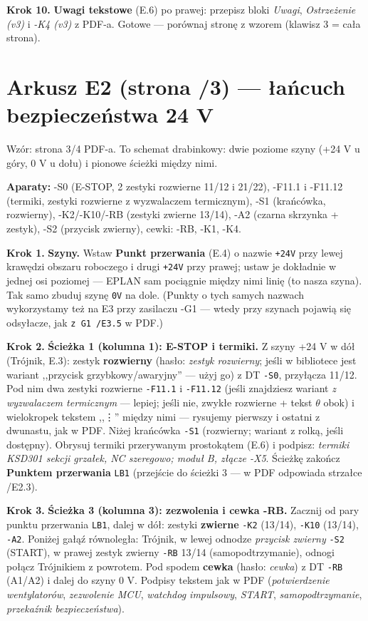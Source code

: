 \documentclass[11pt,a4paper]{article}
\newcommand{\ui}[1]{\textbf{#1}}                    %
\newcommand{\krok}[1]{\par\medskip\noindent\textbf{\color{granat}Krok #1.}\space}
\begin{document}
\krok{10} \textbf{Uwagi tekstowe} (E.6) po prawej: przepisz bloki \emph{Uwagi},
\emph{Ostrzeżenie (v3)} i \emph{-K4 (v3)} z PDF-a. Gotowe --- porównaj stronę z wzorem
(klawisz 3 = cała strona).

\section{Arkusz E2 (strona /3) --- łańcuch bezpieczeństwa 24 V}
\label{sec:e2g}

Wzór: strona 3/4 PDF-a. To schemat drabinkowy: dwie poziome szyny (+24 V u góry, 0 V u dołu)
i pionowe ścieżki między nimi.

\textbf{Aparaty:} -S0 (E-STOP, 2 zestyki rozwierne 11/12 i 21/22), -F11.1 i -F11.12 (termiki,
zestyki rozwierne z wyzwalaczem termicznym), -S1 (krańcówka, rozwierny), -K2/-K10/-RB (zestyki
zwierne 13/14), -A2 (czarna skrzynka + zestyk), -S2 (przycisk zwierny), cewki: -RB, -K1, -K4.

\krok{1} \textbf{Szyny.} Wstaw \ui{Punkt przerwania} (E.4) o nazwie \texttt{+24V} przy lewej
krawędzi obszaru roboczego i drugi \texttt{+24V} przy prawej; ustaw je dokładnie w jednej osi
poziomej --- EPLAN sam pociągnie między nimi linię (to nasza szyna). Tak samo zbuduj szynę
\texttt{0V} na dole. (Punkty o tych samych nazwach wykorzystamy też na E3 przy zasilaczu -G1 ---
wtedy przy szynach pojawią się odsyłacze, jak \texttt{z G1 /E3.5} w PDF.)

\krok{2} \textbf{Ścieżka 1 (kolumna 1): E-STOP i termiki.} Z szyny +24 V w dół (Trójnik, E.3):
zestyk \textbf{rozwierny} (hasło: \emph{zestyk rozwierny}; jeśli w bibliotece jest wariant
,,przycisk grzybkowy/awaryjny'' --- użyj go) z DT \texttt{-S0}, przyłącza 11/12. Pod nim dwa
zestyki rozwierne \texttt{-F11.1} i \texttt{-F11.12} (jeśli znajdziesz wariant \emph{z wyzwalaczem
termicznym} --- lepiej; jeśli nie, zwykłe rozwierne + tekst $\theta$ obok) i wielokropek tekstem
,,\vdots'' między nimi --- rysujemy pierwszy i ostatni z dwunastu, jak w PDF. Niżej krańcówka
\texttt{-S1} (rozwierny; wariant z rolką, jeśli dostępny). Obrysuj termiki przerywanym
prostokątem (E.6) i podpisz: \emph{termiki KSD301 sekcji grzałek, NC szeregowo; moduł B, złącze
-X5}. Ścieżkę zakończ \ui{Punktem przerwania} \texttt{LB1} (przejście do ścieżki 3 --- w PDF
odpowiada strzałce /E2.3).

\krok{3} \textbf{Ścieżka 3 (kolumna 3): zezwolenia i cewka -RB.} Zacznij od pary punktu
przerwania \texttt{LB1}, dalej w dół: zestyki \textbf{zwierne} \texttt{-K2} (13/14),
\texttt{-K10} (13/14), \texttt{-A2}. Poniżej gałąź równoległa: Trójnik, w lewej odnodze
\emph{przycisk zwierny} \texttt{-S2} (START), w prawej zestyk zwierny \texttt{-RB} 13/14
(samopodtrzymanie), odnogi połącz Trójnikiem z powrotem. Pod spodem \textbf{cewka} (hasło:
\emph{cewka}) z DT \texttt{-RB} (A1/A2) i dalej do szyny 0 V. Podpisy tekstem jak w PDF
(\emph{potwierdzenie wentylatorów}, \emph{zezwolenie MCU}, \emph{watchdog impulsowy},
\emph{START}, \emph{samopodtrzymanie}, \emph{przekaźnik bezpieczeństwa}).
\end{document}
